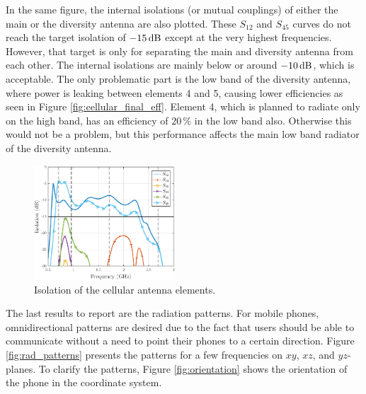 In the same figure, the internal isolations (or mutual couplings) of either the main or the diversity antenna are also plotted. These $S_{12}$ and $S_{45}$ curves do not reach the target isolation of $-15\,\mathrm{dB}$ except at the very highest frequencies. However, that target is only for separating the main and diversity antenna from each other. The internal isolations are mainly below or around $-10\,\mathrm{dB}$, which is acceptable. The only problematic part is the low band of the diversity antenna, where power is leaking between elements 4 and 5, causing lower efficiencies as seen in Figure \ref{fig:cellular_final_eff}. Element 4, which is planned to radiate only on the high band, has an efficiency of $20\,\%$ in the low band also. Otherwise this would not be a problem, but this performance affects the main low band radiator of the diversity antenna.
\begin{figure}[H]
    \centering
    \vspace{-10pt}
    \includegraphics[width=0.47\textwidth]{img/isolation_match_wgps.eps}
    \vspace{-7pt}
    \caption{Isolation of the cellular antenna elements.}
    \label{fig:isolation}
    \vspace{-15pt}
\end{figure}

The last results to report are the radiation patterns. For mobile phones, omnidirectional patterns are desired due to the fact that users should be able to communicate without a need to point their phones to a certain direction. Figure \ref{fig:rad_patterns} presents the patterns for a few frequencies on $xy$, $xz$, and $yz$-planes. To clarify the patterns, Figure \ref{fig:orientation} shows the orientation of the phone in the coordinate system.

